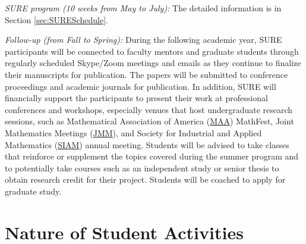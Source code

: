 \documentclass[11pt]{NSFamsart}
\newcommand{\MAA}{\hyperlink{MAAlink}{MAA}\xspace}
\newcommand{\JMM}{\hyperlink{JMMlink}{JMM}\xspace}
\newcommand{\SIAM}{\hyperlink{SIAMlink}{SIAM}\xspace}
\begin{document}
\noindent\emph{SURE program (10 weeks from
May to July):} 
The detailed
information is in Section \ref{sec:SURESchedule}.

\noindent\emph{Follow-up (from Fall to Spring):} During the following academic year, SURE participants will be connected to faculty mentors and graduate students through regularly scheduled Skype/Zoom meetings and emails as they continue to finalize their manuscripts for publication. The papers will be submitted to conference proceedings and academic journals for publication. In addition, SURE will financially support the participants to present their work at professional conferences and workshops, especially venues that host undergraduate research sessions, such as \hypertarget{MAAlink}{Mathematical Association of America} (\MAA) MathFest, \hypertarget{JMMlink}{Joint Mathematics Meetings} (\JMM), and \hypertarget{SIAMlink}{Society for Industrial and Applied Mathematics} (\SIAM) annual meeting. Students will be advised to take classes that reinforce or supplement the topics covered during the summer program and to potentially take courses such as an independent study or senior thesis to obtain research credit for their project. Students will be coached to apply for graduate study.



\section{Nature of Student Activities}
\end{document}
